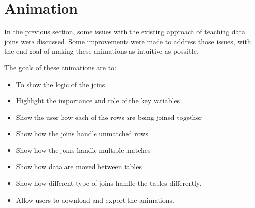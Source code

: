 \section{Animation}

In the previous section, some issues with the existing approach of teaching data joins were discussed. Some improvements were made to address those issues, with the end goal of making these animations as intuitive as possible. 

The goals of these animations are to:

\begin{itemize}
    \item To show the logic of the joins
    \item Highlight the importance and role of the key variables
    \item Show the user how each of the rows are being joined together
    \item Show how the joins handle unmatched rows
    \item Show how the joins handle multiple matches
    \item Show how data are moved between tables
    \item Show how different type of joins handle the tables differently.
    \item Allow users to download and export the animations.
\end{itemize}
